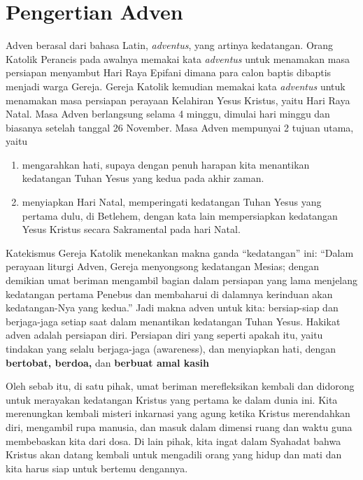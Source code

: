 \small

\section*{Pengertian Adven} 

Adven berasal dari bahasa Latin, \textit{adventus}, yang artinya kedatangan. Orang Katolik Perancis pada awalnya memakai kata \textit{adventus} untuk menamakan masa persiapan menyambut Hari Raya Epifani dimana para calon baptis dibaptis menjadi warga Gereja. Gereja Katolik kemudian memakai kata \textit{adventus} untuk menamakan masa persiapan perayaan Kelahiran Yesus Kristus, yaitu Hari Raya Natal. Masa Adven berlangsung selama 4 minggu, dimulai hari minggu dan biasanya setelah tanggal 26 November. Masa Adven mempunyai 2 tujuan utama, yaitu

\begin{enumerate}[itemsep=0ex]
\item mengarahkan hati, supaya dengan penuh harapan kita menantikan kedatangan Tuhan Yesus yang kedua pada akhir zaman.
\item menyiapkan Hari Natal, memperingati kedatangan Tuhan Yesus yang pertama dulu, di Betlehem, dengan kata lain mempersiapkan kedatangan Yesus Kristus secara Sakramental pada hari Natal.
\end{enumerate}

Katekismus Gereja Katolik menekankan makna ganda ``kedatangan'' ini: ``Dalam perayaan liturgi Adven, Gereja menyongsong kedatangan Mesias; dengan demikian umat beriman mengambil bagian dalam persiapan yang lama menjelang kedatangan pertama Penebus dan membaharui di dalamnya kerinduan akan kedatangan-Nya yang kedua.'' Jadi makna adven untuk kita: bersiap-siap dan berjaga-jaga setiap saat dalam menantikan kedatangan Tuhan Yesus. Hakikat adven adalah persiapan diri. Persiapan diri yang seperti apakah itu, yaitu tindakan yang selalu berjaga-jaga (awareness), dan menyiapkan hati, dengan
\textbf{bertobat,
berdoa,} dan \textbf{
berbuat amal kasih
}

Oleh sebab itu, di satu pihak, umat beriman merefleksikan kembali dan didorong untuk merayakan kedatangan Kristus yang pertama ke dalam dunia ini. Kita merenungkan kembali misteri inkarnasi yang agung ketika Kristus merendahkan diri, mengambil rupa manusia, dan masuk dalam dimensi ruang dan waktu guna membebaskan kita dari dosa. Di lain pihak, kita  ingat dalam Syahadat bahwa Kristus akan datang kembali untuk mengadili orang yang hidup dan mati dan kita harus siap untuk bertemu dengannya. 

